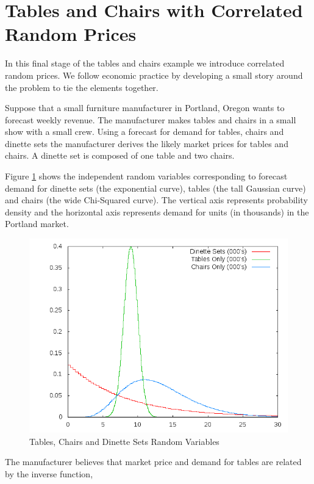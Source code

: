 \section{Tables and Chairs with Correlated Random Prices}

In this final stage of the tables and chairs example we introduce
correlated random prices. We follow economic practice by developing a
small story around the problem to tie the elements together.

Suppose that a small furniture manufacturer in Portland, Oregon wants
to forecast weekly revenue. The manufacturer makes tables and chairs in
a small show with a small crew. Using a forecast for demand for
tables, chairs and dinette sets the manufacturer derives the likely
market prices for tables and chairs. A dinette set is composed of one
table and two chairs.

Figure \ref{fig:TCD} shows the independent random variables
corresponding to forecast demand for dinette sets (the exponential
curve), tables (the tall Gaussian curve) and chairs (the wide
Chi-Squared curve). The vertical axis represents probability density
and the horizontal axis represents demand for units (in thousands) in
the Portland market.

\begin{figure}
  \centering
  \includegraphics[width=120mm]{Images/TCD}
  \caption[Tables, Chairs and Dinette Sets Random Variables]
          {Tables, Chairs and Dinette Sets Random Variables}
  \label{fig:TCD}
\end{figure}

The manufacturer believes that market price and demand for tables are
related by the inverse function,

